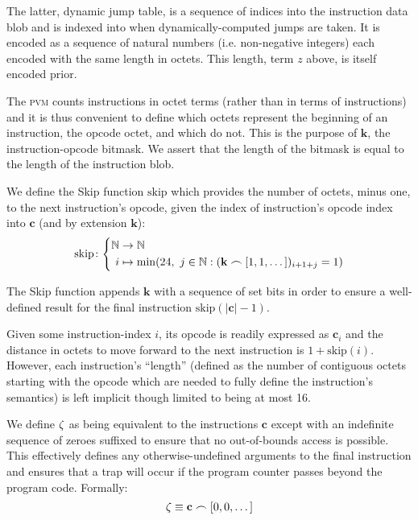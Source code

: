 The latter, dynamic jump table, is a sequence of indices into the instruction data blob and is indexed into when dynamically-computed jumps are taken. It is encoded as a sequence of natural numbers (i.e. non-negative integers) each encoded with the same length in octets. This length, term $z$ above, is itself encoded prior.

The \textsc{pvm} counts instructions in octet terms (rather than in terms of instructions) and it is thus convenient to define which octets represent the beginning of an instruction, \ie the opcode octet, and which do not. This is the purpose of $\mathbf{k}$, the instruction-opcode bitmask. We assert that the length of the bitmask is equal to the length of the instruction blob.

\newcommand{\Fskip}{\text{skip}}

We define the Skip function $\Fskip$ which provides the number of octets, minus one, to the next instruction's opcode, given the index of instruction's opcode index into $\mathbf{c}$ (and by extension $\mathbf{k}$):
\begin{equation}
  \Fskip\colon\left\{\begin{aligned}
    \N &\to \N\\
    i &\mapsto \min(24,\ j \in \N : (\mathbf{k} \frown [1, 1, \dots])_{i + 1 + j} = 1)
  \end{aligned}\right.
\end{equation}

The Skip function appends $\mathbf{k}$ with a sequence of set bits in order to ensure a well-defined result for the final instruction $\Fskip(|\mathbf{c}| - 1)$.

Given some instruction-index $i$, its opcode is readily expressed as $\mathbf{c}_i$ and the distance in octets to move forward to the next instruction is $1 + \Fskip(i)$. However, each instruction's ``length'' (defined as the number of contiguous octets starting with the opcode which are needed to fully define the instruction's semantics) is left implicit though limited to being at most 16.

We define $\zeta$ as being equivalent to the instructions $\mathbf{c}$ except with an indefinite sequence of zeroes suffixed to ensure that no out-of-bounds access is possible. This effectively defines any otherwise-undefined arguments to the final instruction and ensures that a trap will occur if the program counter passes beyond the program code. Formally:
\begin{equation}\label{eq:instructions}
  \instructions \equiv \mathbf{c} \concat \sq{0, 0, \dots}
\end{equation}

